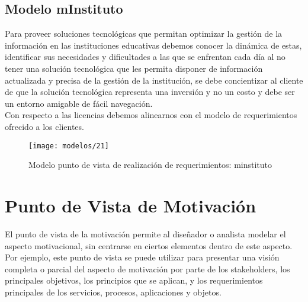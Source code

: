    \subsection{Modelo mInstituto}
   Para proveer soluciones tecnológicas que permitan optimizar la gestión de la información en las instituciones educativas debemos conocer la dinámica de estas, identificar sus necesidades y dificultades a las que se enfrentan cada día al no tener una solución tecnológica que les permita disponer de información actualizada y precisa de la gestión de la institución, se debe concientizar al cliente de que la solución tecnológica representa una inversión y no un costo y debe ser un entorno amigable de fácil navegación. \\
   
   Con respecto a las licencias debemos alinearnos con el modelo de requerimientos ofrecido a los clientes.

   \begin{figure}[H]
   	\centering
   	\texttt{[image: modelos/21]}
   	\captionsetup{width=.95\textwidth}
   	\caption{Modelo punto de vista de realización de requerimientos: minstituto}
   	\label{modelo21}
   \end{figure}
   
\section{Punto de Vista de Motivación}
El punto de vista de la motivación permite al diseñador o analista modelar el aspecto motivacional, sin centrarse en ciertos elementos dentro de este aspecto. Por ejemplo, este punto de vista se puede utilizar para presentar una visión completa o parcial del aspecto de motivación por parte de los stakeholders, los principales objetivos, los principios que se aplican, y los requerimientos principales de los servicios, procesos, aplicaciones y objetos. \cite{ref9}

